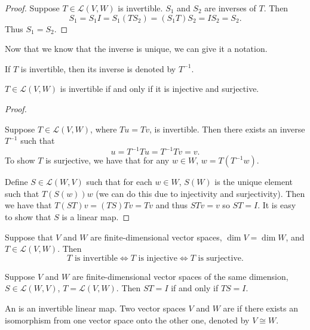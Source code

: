 \begin{proof}
Suppose $T\in\mathcal{L}(V,W)$ is invertible. $S_1$ and $S_2$ are inverses of $T$. Then
\[S_1=S_1I=S_1(TS_2)=(S_1T)S_2=IS_2=S_2.\]
Thus $S_1=S_2$.
\end{proof}

Now that we know that the inverse is unique, we can give it a notation.

\begin{notation}
If $T$ is invertible, then its inverse is denoted by $T^{-1}$.
\end{notation}

\begin{proposition}
$T\in\mathcal{L}(V,W)$ is invertible if and only if it is injective and surjective.
\end{proposition}

\begin{proof} \

\fbox{$\implies$} Suppose $T\in\mathcal{L}(V,W)$, where $Tu=Tv$, is invertible. Then there exists an inverse $T^{-1}$ such that
\[u=T^{-1}Tu=T^{-1}Tv=v.\]
To show $T$ is surjective, we have that for any $w\in W$, $w=T(T^{-1}w)$.

\fbox{$\impliedby$} Define $S\in\mathcal{L}(W,V)$ such that for each $w\in W$, $S(W)$ is the unique element such that $T(S(w))w$ (we can do this due to injectivity and surjectivity). Then we have that $T(ST)v=(TS)Tv=Tv$ and thus $STv=v$ so $ST=I$. It is easy to show that $S$ is a linear map.
\end{proof}

\begin{proposition}
Suppose that $V$ and $W$ are finite-dimensional vector spaces, $\dim V=\dim W$, and $T\in\mathcal{L}(V,W)$. Then
\[T\text{ is invertible}\iff T\text{ is injective}\iff T\text{ is surjective}.\]
\end{proposition}

\begin{corollary}
Suppose $V$ and $W$ are finite-dimensional vector spaces of the same dimension, $S\in\mathcal{L}(W,V)$, $T=\mathcal{L}(V,W)$. Then $ST=I$ if and only if $TS=I$.
\end{corollary}

\begin{definition}[Isomorphism]
An  is an invertible linear map. Two vector spaces $V$ and $W$ are  if there exists an isomorphism from one vector space onto the other one, denoted by $V\cong W$.
\end{definition}

